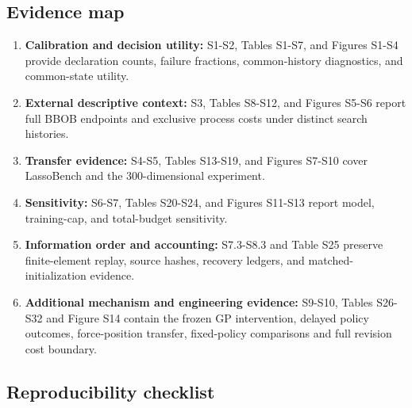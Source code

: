 \documentclass[suppldata]{interact}
\providecommand{\tightlist}{\setlength{\itemsep}{0pt}\setlength{\parskip}{0pt}}
\begin{document}
\hypertarget{evidence-map}{%
\subsection{Evidence map}\label{evidence-map}}

\begin{enumerate}
\def\labelenumi{\arabic{enumi}.}
\tightlist
\item
  \textbf{Calibration and decision utility:} S1-S2, Tables S1-S7, and Figures S1-S4 provide declaration counts, failure fractions, common-history diagnostics, and common-state utility.
\item
  \textbf{External descriptive context:} S3, Tables S8-S12, and Figures S5-S6 report full BBOB endpoints and exclusive process costs under distinct search histories.
\item
  \textbf{Transfer evidence:} S4-S5, Tables S13-S19, and Figures S7-S10 cover LassoBench and the 300-dimensional experiment.
\item
  \textbf{Sensitivity:} S6-S7, Tables S20-S24, and Figures S11-S13 report model, training-cap, and total-budget sensitivity.
\item
  \textbf{Information order and accounting:} S7.3-S8.3 and Table S25 preserve finite-element replay, source hashes, recovery ledgers, and matched-initialization evidence.
\item
  \textbf{Additional mechanism and engineering evidence:} S9-S10, Tables S26-S32 and Figure S14 contain the frozen GP intervention, delayed policy outcomes, force-position transfer, fixed-policy comparisons and full revision cost boundary.
\end{enumerate}

\hypertarget{reproducibility-checklist}{%
\subsection{Reproducibility checklist}\label{reproducibility-checklist}}
\end{document}
